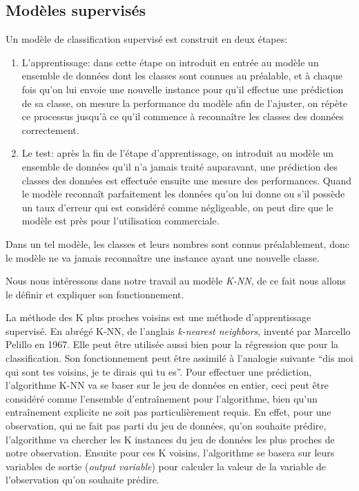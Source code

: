 \subsection{ Modèles supervisés}
Un modèle de classification supervisé est construit en deux étapes:
	\begin{enumerate}

		\item L’apprentissage: dans cette étape on introduit en entrée au modèle un ensemble de données dont les classes sont connues au préalable, et à chaque  fois qu'on lui envoie une nouvelle instance pour qu'il effectue une prédiction de sa classe, on mesure la performance du modèle afin de l'ajuster, on répète ce processus jusqu'à ce qu'il commence à reconnaître les classes des données correctement.
		
		\item Le test: après la fin de l’étape d’apprentissage, on introduit au modèle un ensemble de données qu’il n’a jamais traité auparavant, une prédiction des classes des données est effectuée ensuite une mesure des performances. Quand le modèle reconnaît parfaitement les données qu’on lui donne ou s'il possède un taux d’erreur qui est considéré comme négligeable, on peut dire que le modèle est près pour l’utilisation commerciale.	
	\end{enumerate}


Dans un tel modèle, les classes et leurs nombres sont connus préalablement, donc le modèle ne va jamais reconnaître une instance ayant une nouvelle classe.

Nous nous intéressons dans notre travail au modèle \textit{K-NN}, de ce fait nous allons le définir et expliquer son fonctionnement.

La méthode des K plus proches voisins est une méthode d’apprentissage supervisé. En abrégé K-NN, de l'anglais \textit{k-nearest neighbors}, inventé par Marcello Pelillo en 1967. Elle peut être utilisée aussi bien pour la régression que pour la classification. Son fonctionnement peut être assimilé à l’analogie suivante “dis moi qui sont tes voisins, je te dirais qui tu es”.
Pour effectuer une prédiction, l’algorithme K-NN va se baser sur le jeu de données en entier, ceci peut être considéré comme l'ensemble d'entraînement pour l'algorithme, bien qu'un entraînement explicite ne soit pas particulièrement requis. En effet, pour une observation, qui ne fait pas parti du jeu de données, qu’on souhaite prédire, l’algorithme va chercher les K instances du jeu de données les plus proches de notre observation. Ensuite pour ces K voisins, l’algorithme se basera sur leurs variables de sortie (\textit{output variable}) pour calculer la valeur de la variable de l’observation qu’on souhaite prédire. 

